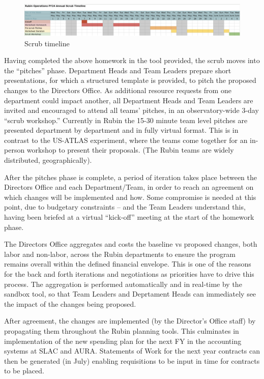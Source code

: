 \begin{figure}[hb!]
\begin{centering}
\includegraphics[width=1.0\textwidth]{Figure1Scrubtimeline}
	\caption{Scrub timeline
\label{fig:timeline}}
\end{centering}
\end{figure}
Having completed the above homework in the tool provided, the scrub moves into the ``pitches'' phase. 
Department Heads and Team Leaders prepare short presentations, for which a structured template is provided, to pitch the proposed changes to the Directors Office. 
As additional resource requests from one department could impact another, all Department Heads and Team Leaders are invited and encouraged to attend all teams' pitches, in an observatory-wide 3-day ``scrub workshop.'' 
Currently in Rubin the 15-30 minute team level pitches are presented department by department and in fully virtual format. 
This is in contrast to the US-ATLAS experiment, where the teams come together for an in-person workshop to present their proposals.
(The Rubin teams are widely distributed, geographically).

After the pitches phase is complete, a period of iteration takes place between the Directors Office and each Department/Team, in order to reach an agreement on which changes will be implemented and how.
Some compromise is needed at this point, due to budgetary constraints -- and the Team Leaders understand this, having been briefed at a virtual ``kick-off'' meeting at the start of the homework phase.

The Directors Office aggregates and costs the baseline vs proposed changes, both labor and non-labor, across the Rubin departments to ensure the program remains overall within the defined financial envelope. 
This is one of the reasons for the back and forth iterations and negotiations as priorities have to drive this process.
The aggregation is performed automatically and in real-time by the sandbox tool, so that Team Leaders and Deprtament Heads can immediately see the impact of the changes being proposed.

After agreement, the changes are implemented (by the Director's Office staff) by propagating them throughout the Rubin planning tools.
This culminates in implementation of the new spending plan for the next FY in the accounting systems at SLAC and AURA. 
Statements of Work for the next year contracts can then be generated (in July) enabling requisitions to be input in time for contracts to be placed.

